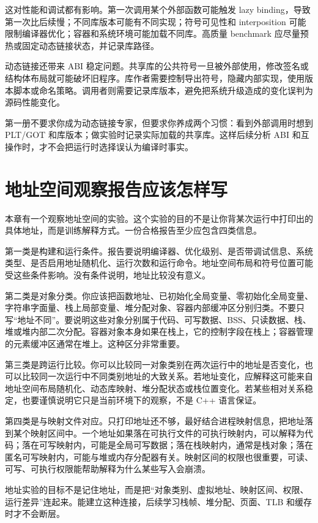 这对性能和调试都有影响。第一次调用某个外部函数可能触发 lazy binding，导致第一次比后续慢；不同库版本可能有不同实现；符号可见性和 interposition 可能限制编译器优化；容器和系统环境可能加载不同库。高质量 benchmark 应尽量预热或固定动态链接状态，并记录库路径。

动态链接还带来 ABI 稳定问题。共享库的公共符号一旦被外部使用，修改签名或结构体布局就可能破坏旧程序。库作者需要控制导出符号，隐藏内部实现，使用版本脚本或命名策略。调用者则需要记录库版本，避免把系统升级造成的变化误判为源码性能变化。

第一册不要求你成为动态链接专家，但要求你养成两个习惯：看到外部调用时想到 PLT/GOT 和库版本；做实验时记录实际加载的共享库。这样后续分析 ABI 和互操作时，才不会把运行时选择误认为编译时事实。

\section{地址空间观察报告应该怎样写}

本章有一个观察地址空间的实验。这个实验的目的不是让你背某次运行中打印出的具体地址，而是训练解释方式。一份合格报告至少应包含四类信息。

第一类是构建和运行条件。报告要说明编译器、优化级别、是否带调试信息、系统类型、是否启用地址随机化、运行次数和运行命令。地址空间布局和符号位置可能受这些条件影响。没有条件说明，地址比较没有意义。

第二类是对象分类。你应该把函数地址、已初始化全局变量、零初始化全局变量、字符串字面量、栈上局部变量、堆分配对象、容器内部缓冲区分别归类。不要只写“地址不同”。要说明这些对象分别属于代码、可写数据、BSS、只读数据、栈、堆或堆内部二次分配。容器对象本身如果在栈上，它的控制字段在栈上；容器管理的元素缓冲区通常在堆上。这种区分非常重要。

第三类是跨运行比较。你可以比较同一对象类别在两次运行中的地址是否变化，也可以比较同一次运行中不同类别地址的大致关系。若地址变化，应解释这可能来自地址空间布局随机化、动态库映射、堆分配状态或栈位置变化。若某些相对关系稳定，也要谨慎说明它只是当前环境下的观察，不是 C++ 语言保证。

第四类是与映射文件对应。只打印地址还不够，最好结合进程映射信息，把地址落到某个映射区间中。一个地址如果落在可执行文件的可执行映射内，可以解释为代码；落在可写映射内，可能是全局可写数据；落在栈映射内，通常是栈对象；落在匿名可写映射内，可能与堆或内存分配器有关。映射区间的权限也很重要，可读、可写、可执行权限能帮助解释为什么某些写入会崩溃。

\begin{keyidea}
地址实验的目标不是记住地址，而是把“对象类别、虚拟地址、映射区间、权限、运行差异”连起来。能建立这种连接，后续学习栈帧、堆分配、页面、TLB 和缓存时才不会断层。
\end{keyidea}

